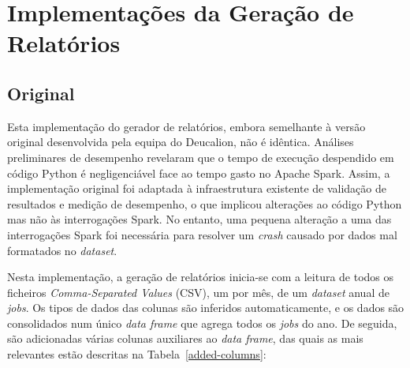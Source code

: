 \documentclass[11pt, a4paper]{article}
\begin{document}
\vspace{-0.5\baselineskip}
\section{Implementações da Geração de Relatórios} %

\subsection{Original}

Esta implementação do gerador de relatórios, embora semelhante à versão original desenvolvida pela
equipa do Deucalion, não é idêntica. Análises preliminares de desempenho revelaram que o tempo de
execução despendido em código Python é negligenciável face ao tempo gasto no Apache Spark. Assim, a
implementação original foi adaptada à infraestrutura existente de validação de resultados e medição
de desempenho, o que implicou alterações ao código Python mas não às interrogações Spark. No
entanto, uma pequena alteração a uma das interrogações Spark foi necessária para resolver um
\emph{crash} causado por dados mal formatados no \emph{dataset}.

Nesta implementação, a geração de relatórios inicia-se com a leitura de todos os ficheiros
\emph{Comma-Separated Values} (CSV), um por mês, de um \emph{dataset} anual de \emph{jobs}. Os tipos
de dados das colunas são inferidos automaticamente, e os dados são consolidados num único \emph{data
frame} que agrega todos os \emph{jobs} do ano. De seguida, são adicionadas várias colunas auxiliares
ao \emph{data frame}, das quais as mais relevantes estão descritas na Tabela \ref{added-columns}:
\end{document}

